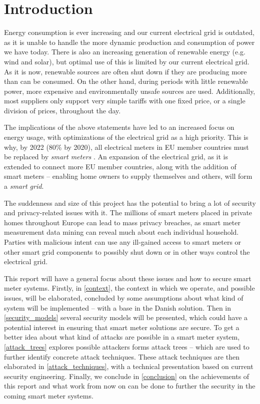 
\chapter*{Introduction}

Energy consumption is ever increasing and our current electrical grid is outdated, as it is unable to handle the more dynamic production and consumption of power we have today.
There is also an increasing generation of renewable energy (e.g. wind and solar), but optimal use of this is limited by our current electrical grid.
As it is now, renewable sources are often shut down if they are producing more than can be consumed.
On the other hand, during periods with little renewable power, more expensive and environmentally unsafe sources are used.
Additionally, most suppliers only support very simple tariffs with one fixed price, or a single division of prices, throughout the day.

The implications of the above statements have led to an increased focus on energy usage, with optimizations of the electrical grid as a high priority.
This is why, by 2022 (80\% by 2020), all  electrical meters in EU member countries must be replaced by \emph{smart meters} \cite{smart_meter_survey, directive_2009_72_EC}.
An expansion of the electrical grid, as it is extended to connect more EU member countries, along with the addition of smart meters -- enabling home owners to supply themselves and others, will form a \emph{smart grid}.

The suddenness and size of this project has the potential to bring a lot of security and privacy-related issues with it.
The millions of smart meters placed in private homes throughout Europe can lead to mass privacy breaches, as smart meter measurement data mining can reveal much about each individual household.
Parties with malicious intent can use any ill-gained access to smart meters or other smart grid components to possibly shut down or in other ways control the electrical grid.

This report will have a general focus about these issues and how to secure smart meter systems.
Firstly, in \cref{context}, the context in which we operate, and possible issues, will be elaborated, concluded by some assumptions about what kind of system will be implemented -- with a base in the Danish solution.
Then in \cref{security_models} several security models will be presented, which could have a potential interest in ensuring that smart meter solutions are secure.
To get a better idea about what kind of attacks are possible in a smart meter system, \cref{attack_trees} explores possible attackers forms attack trees -- which are used to further identify concrete attack techniques.
These attack techniques are then elaborated in \cref{attack_techniques}, with a technical presentation based on current security engineering.
Finally, we conclude in \cref{conclusion} on the achievements of this report and what work from now on can be done to further the security in the coming smart meter systems.
